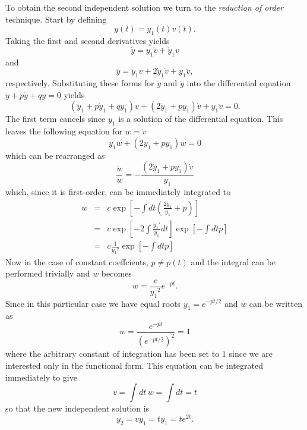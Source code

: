 \documentclass[10pt]{article}
\begin{document}
To obtain the second independent solution we turn to the \emph{reduction of order} technique.
Start by defining
\[
  y(t) = y_1(t) v(t) .
\]
Taking the first and second derivatives yields
\[
  {\dot y} = y_1 {\dot v} + {\dot y}_1 v
\]
and
\[
  {\ddot y} = {\ddot y}_1 v + 2 {\dot y}_1 {\dot v} + y_1 {\ddot v} ,
\]
respectively.
Substituting these forms for ${\dot y}$ and ${\ddot y}$ into the differential
equation ${\ddot y} + p {\dot y} + q y = 0$ yields
\[
    \left( {\ddot y}_1 + p {\dot y}_1 + q y_1 \right) v 
  + \left(2 {\dot y}_1 + p y_1 \right) {\dot v} 
  + y_1 {\ddot v} = 0 .
\]
The first term cancels since $y_1$ is a solution of the differential equation.
This leaves the following equation for $w = {\dot v}$
\[
  y_1 {\dot w} + (2 {\dot y}_1 + p y_1) w = 0
\]
which can be rearranged as
\[
 \frac{\dot w}{w} = -\frac{ (2 {\dot y}_1 + p y_1) {\dot v} }{y_1}
\]
which, since it is first-order, can be immediately integrated to
\begin{eqnarray*}
w & = & c \exp \left[ -\int dt \left(\frac{2 {\dot y}_1}{y_1} + p \right) \right] \\
  & = & c \exp \left[ -2 \int \frac{ {\dot y}_1' }{y_1} dt \right] \exp \left[ -\int dt p \right]  \\
  & = & c \frac{1}{{y_1}^2} \exp \left[ -\int dt p \right] 
\end{eqnarray*}
Now in the case of constant coeffcients, $p \neq p(t)$ and the integral can be 
performed trivially and $w$ becomes
\[
  w = \frac{c}{ {y_1}^2 } e^{-p t} .
\]
Since in this particular case we have equal roots $y_1 = e^{-p t /2}$ and $w$ can be 
written as
\[
  w = \frac{e^{-pt}}{\left( e^{-pt/2} \right)^2 } = 1 
\]
where the arbitrary constant of integration has been set to $1$ since we 
are interested only in the functional form.  This equation can be integrated 
immediately to give
\[
  v = \int dt \, w = \int dt = t
\]
so that the new independent solution is
\[
  y_2 = v y_1 = t y_1 = t e^{2 t}.
\]
\end{document}

